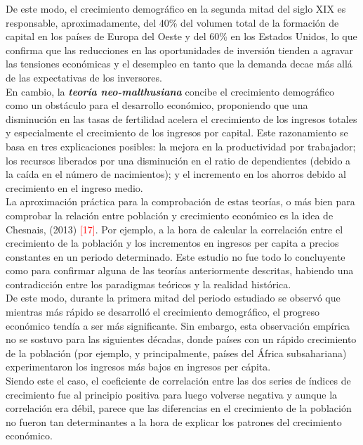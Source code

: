 \vspace{-0.2cm}
De este modo, el crecimiento demogr\'afico en la segunda mitad del siglo XIX es responsable, aproximadamente, del 40\% del volumen total de la formaci\'on de capital en los pa\'ises de Europa del Oeste y del 60\% en los Estados Unidos, lo que confirma que las reducciones en las oportunidades de inversi\'on tienden a agravar las tensiones econ\'omicas y el desempleo en tanto que la demanda decae m\'as all\'a de las expectativas de los inversores.\\

\vspace{-0.2cm}
En cambio, la \textbf{\textit{teor\'ia neo-malthusiana}} concibe el crecimiento demogr\'afico como un obst\'aculo para el desarrollo econ\'omico, proponiendo que una disminuci\'on en las tasas de fertilidad acelera el crecimiento de los ingresos totales y especialmente el crecimiento de los ingresos por capital. Este razonamiento se basa en tres explicaciones posibles: la mejora en la productividad por trabajador; los recursos liberados por una disminuci\'on en el ratio de dependientes (debido a la ca\'ida en el n\'umero de nacimientos); y el incremento en los ahorros debido al crecimiento en el ingreso medio.\\

\vspace{-0.2cm}
La aproximaci\'on pr\'actica para la comprobaci\'on de estas teor\'ias, o m\'as bien para comprobar la relaci\'on entre poblaci\'on y crecimiento econ\'omico es la idea de Chesnais, (2013) \textcolor{red}{[17]}. Por ejemplo, a la hora de calcular la correlaci\'on entre el crecimiento de la poblaci\'on y los incrementos en ingresos per capita a precios constantes en un periodo determinado. Este estudio no fue todo lo concluyente como para confirmar alguna de las teor\'ias anteriormente descritas, habiendo una contradicci\'on entre los paradigmas te\'oricos y la realidad hist\'orica.\\

\vspace{-0.2cm}
De este modo, durante la primera mitad del periodo estudiado se observ\'o que mientras m\'as r\'apido se desarroll\'o el crecimiento demogr\'afico, el progreso econ\'omico tend\'ia a ser m\'as significante. Sin embargo, esta observaci\'on emp\'irica no se sostuvo para las siguientes d\'ecadas, donde pa\'ises con un r\'apido crecimiento de la poblaci\'on (por ejemplo, y principalmente, pa\'ises del \'Africa subsahariana) experimentaron los ingresos m\'as bajos en ingresos per c\'apita.\\
Siendo este el caso, el coeficiente de correlaci\'on entre las dos series de \'indices de crecimiento fue al principio positiva para luego volverse negativa y aunque la correlaci\'on era d\'ebil, parece que las diferencias en el crecimiento de la poblaci\'on no fueron tan determinantes a la hora de explicar los patrones del crecimiento econ\'omico.\\

